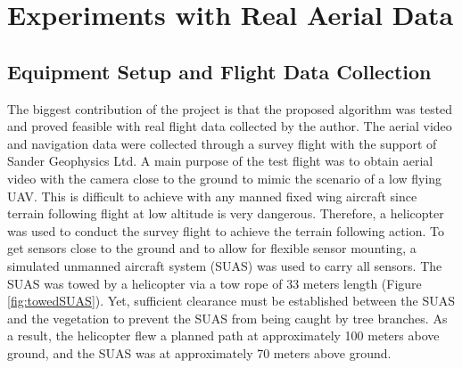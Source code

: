 \chapter{Experiments with Real Aerial Data}
\section{Equipment Setup and Flight Data Collection}
The biggest contribution of the project is that the proposed algorithm
was tested and proved feasible with real flight data collected by the
author. The aerial video and navigation data were collected through a
survey flight with the support of Sander Geophysics Ltd. A main
purpose of the test flight was to obtain aerial video with the camera
close to the ground to mimic the scenario of a low flying UAV. This is
difficult to achieve with any manned fixed wing aircraft since terrain
following flight at low altitude is very dangerous. Therefore, a
helicopter was used to conduct the survey flight to achieve the
terrain following action. To get sensors close to the ground and to
allow for flexible sensor mounting, a simulated unmanned aircraft
system (SUAS) was used to carry all sensors. The SUAS was towed by a
helicopter via a tow rope of 33 meters length (Figure
\ref{fig:towedSUAS}). Yet, sufficient clearance must be established
between the SUAS and the vegetation to prevent the SUAS from being
caught by tree branches. As a result, the helicopter flew a planned
path at approximately 100 meters above ground, and the SUAS was at
approximately 70 meters above ground.

